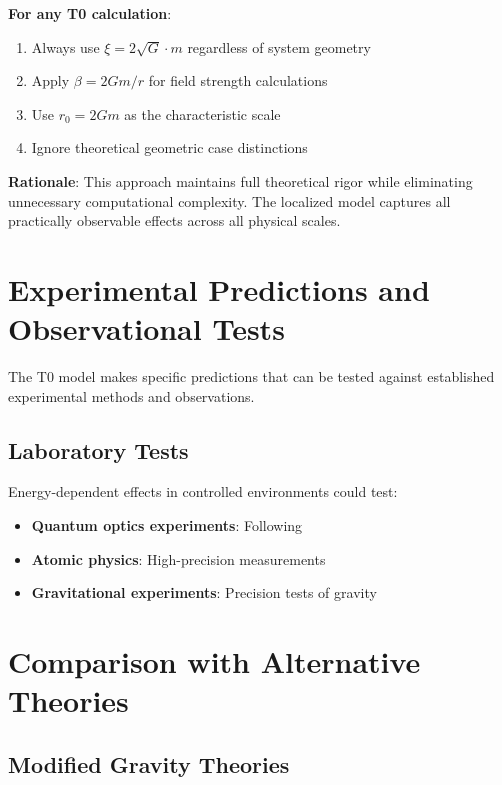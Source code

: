 \documentclass[12pt,a4paper]{article}
\begin{document}
	\textbf{For any T0 calculation}:
	\begin{enumerate}
		\item Always use $\xi = 2\sqrt{G} \cdot m$ regardless of system geometry
		\item Apply $\beta = 2Gm/r$ for field strength calculations
		\item Use $r_0 = 2Gm$ as the characteristic scale
		\item Ignore theoretical geometric case distinctions
	\end{enumerate}
	
	\textbf{Rationale}: This approach maintains full theoretical rigor while eliminating unnecessary computational complexity. The localized model captures all practically observable effects across all physical scales.
	
	\section{Experimental Predictions and Observational Tests}
	\label{sec:experimental_tests}
	
	The T0 model makes specific predictions that can be tested against established experimental methods and observations.
	

	\subsection{Laboratory Tests}
	\label{subsec:laboratory_tests}
	
	Energy-dependent effects in controlled environments could test:
	\begin{itemize}
		\item \textbf{Quantum optics experiments}: Following \citep{scully1997,knight1998}
		\item \textbf{Atomic physics}: High-precision measurements \citep{demtroder2008}
		\item \textbf{Gravitational experiments}: Precision tests of gravity \citep{will2014,adelberger2003}
	\end{itemize}
	
	\section{Comparison with Alternative Theories}
	\label{sec:alternative_theories}
	
	\subsection{Modified Gravity Theories}
	\label{subsec:modified_gravity}
	
\end{document}
